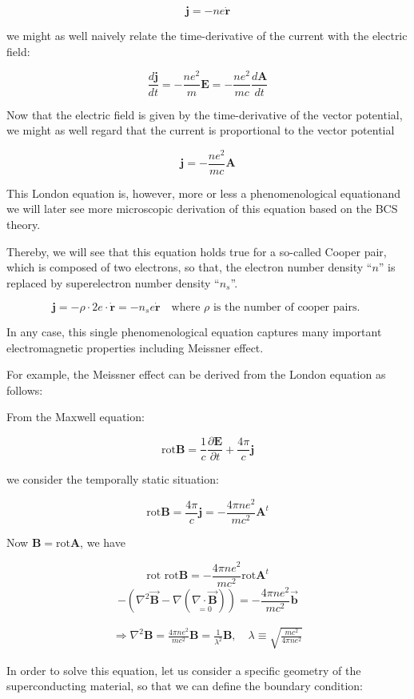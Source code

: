 ﻿\documentclass[twoside]{book}
\numberwithin{equation}{section}
\begin{document}
\[\bm{j} = -ne\dot{\bm{r}} \]

we might as well naively relate the time-derivative of the current with the electric field: 

\[\frac{d\bm{j}}{dt} = -\frac{ne^2}{m}\bm{E} = -\frac{ne^2}{mc}\frac{d\bm{A}}{dt} \]

Now that the electric field is given by the time-derivative of the vector potential, we might as well regard that the current is proportional to the vector potential

\[\bm{j} = -\frac{ne^2}{mc}\bm{A} \]

This London equation is, however, more or less a phenomenological equationand we will later see more microscopic derivation of this equation based on the BCS theory. 

Thereby, we will see that this equation holds true for a so-called Cooper pair, which is composed of two electrons, so that, the electron number density ``$n$'' is replaced by superelectron number density ``$n_s$''. 

\[\bm{j} = -\rho\cdot 2e \cdot\dot{\bm{r}} = -n_s e \dot{\bm{r}}\quad \text{where $\rho$ is the number of cooper pairs. } \]

In any case, this single phenomenological equation captures many important electromagnetic properties including Meissner effect. 

For example, the Meissner effect can be derived from the London equation as follows: 

From the Maxwell equation: 

\[\text{rot} \bm{B} = \frac{1}{c}\frac{\partial \bm{E}}{\partial t} + \frac{4\pi}{c}\bm{j} \]

we consider the temporally static situation: 

\[\text{rot}\bm{B} = \frac{4\pi}{c}\bm{j} = -\frac{4\pi ne^2}{mc^2}\bm{A}^t \]

Now $\bm{B} = \text{rot}\bm{A}$, we have

\[\text{rot\ rot}\bm{B} = -\frac{4\pi ne^2}{mc^2}\text{rot}\bm{A}^t \]
\[-\left(\nabla^2\vec{\bm{B}} - \nabla (\underset{=0}{\nabla \cdot \vec{\bm{B}}})\right) = -\frac{4\pi ne^2}{mc^2}\vec{\bm{b}} \]

\begin{align} \tag{A}
\Rightarrow \nabla^2 \bm{B} = \frac{4\pi ne^2}{mc^2}\bm{B} = \frac{1}{\lambda^2}\bm{B},\quad \lambda \equiv \sqrt{\frac{mc^2}{4\pi ne^2}} 
\end{align}

In order to solve this equation, let us consider a specific geometry of the superconducting material, so that we can define the boundary condition: 
\end{document}

